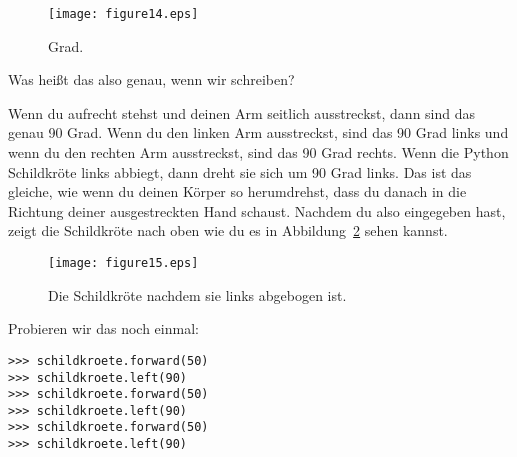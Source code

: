 \begin{figure}
\begin{center}
\texttt{[image: figure14.eps]}
\end{center}
\caption{Grad.}\label{fig14}
\end{figure}


Was heißt das also genau, wenn wir  schreiben?
\par
Wenn du aufrecht stehst und deinen Arm seitlich ausstreckst, dann sind das genau 90 Grad. Wenn du den linken Arm ausstreckst, sind das 90 Grad links und wenn du den rechten Arm ausstreckst, sind das 90 Grad rechts. Wenn die Python Schildkröte links abbiegt, dann dreht sie sich um 90 Grad links. Das ist das gleiche, wie wenn du deinen Körper so herumdrehst, dass du danach in die Richtung deiner ausgestreckten Hand schaust. Nachdem du also  eingegeben hast, zeigt die Schildkröte nach oben wie du es in Abbildung~\ref{fig15} sehen kannst.

\begin{figure}
\begin{center}
\texttt{[image: figure15.eps]}
\end{center}
\caption{Die Schildkröte nachdem sie links abgebogen ist.}\label{fig15}
\end{figure}

Probieren wir das noch einmal:

\begin{Verbatim}[frame=single]
>>> schildkroete.forward(50)
>>> schildkroete.left(90)
>>> schildkroete.forward(50)
>>> schildkroete.left(90)
>>> schildkroete.forward(50)
>>> schildkroete.left(90)
\end{Verbatim}

